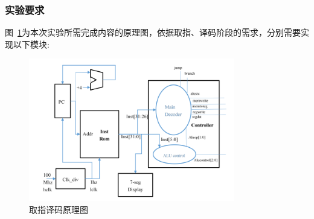 \subsubsection{实验要求}
图~\ref{fig:fetch_decode}为本次实验所需完成内容的原理图，依据取指、译码阶段的需求，分别需要实现以下模块:
\begin{figure}[htbp]
    \centering
    \includegraphics[width = 0.8\textwidth]{image/1_section/fetch_decode.png}
    \caption{取指译码原理图}
    \label{fig:fetch_decode}
\end{figure}

